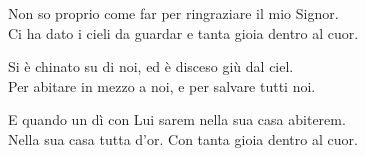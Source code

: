 
\strofa Non so proprio come far per ringraziare il mio Signor.\\
Ci ha dato i cieli da guardar e tanta gioia dentro al cuor.

\spazio


\spazio

\strofa Si è chinato su di noi, ed è disceso giù dal ciel.\\
Per abitare in mezzo a noi, e per salvare tutti noi.

\spazio


\spazio

\strofa E quando un dì con Lui sarem nella sua casa abiterem.\\
Nella sua casa tutta d'or. Con tanta gioia dentro al cuor.

\spazio

